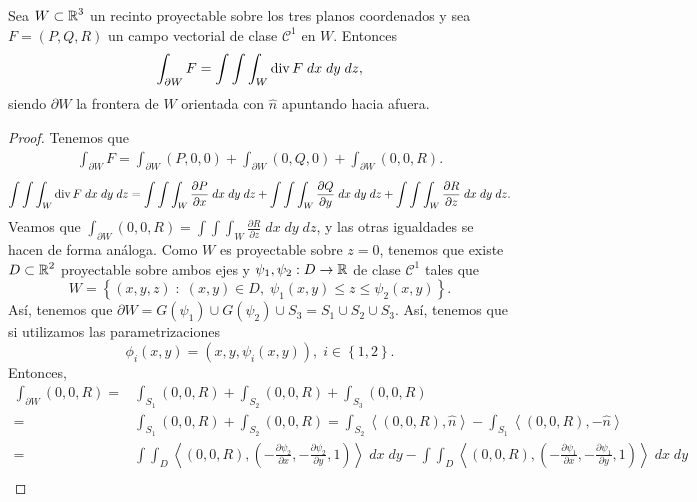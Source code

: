 \begin{theorem}
Sea $\displaystyle W \subset \mathbb{R}^{3} $ un recinto proyectable sobre los tres planos coordenados y sea $\displaystyle F = \left(P, Q, R\right) $ un campo vectorial de clase $\displaystyle \mathcal{C}^{1} $ en $\displaystyle W $. Entonces
\[\int _{\partial W}F =\int \int \int _{W}\operatorname{div} F \; dx \; dy \; dz ,\]
siendo $\displaystyle \partial W $ la frontera de $\displaystyle W $ orientada con $\displaystyle \hat{n} $ apuntando hacia afuera.
\end{theorem}
\begin{proof}
Tenemos que 
\[
\begin{split}
	\int _{\partial W}F =  \int _{\partial W}\left(P, 0, 0\right) + \int _{\partial W}\left(0,Q, 0\right) +\int _{\partial W}\left(0,0,R\right)  .
\end{split}
\]
\[\int \int \int _{W}\operatorname{div} F \; dx \; dy \; dz = \int \int \int _{W}\frac{\partial P}{\partial x} \; dx \; dy \; dz + \int \int \int _{W}\frac{\partial Q}{\partial y} \; dx \; dy \; dz + \int \int \int _{W}\frac{\partial R}{\partial z} \; dx \; dy \; dz .\]
Veamos que $\displaystyle \int _{\partial W}\left(0,0,R\right) =\int \int \int _{W}\frac{\partial R}{\partial z} \; dx \; dy \; dz $, y las otras igualdades se hacen de forma análoga. 
Como $\displaystyle W $ es proyectable sobre $\displaystyle z = 0 $, tenemos que existe $\displaystyle D \subset \mathbb{R}^{2} $ proyectable sobre ambos ejes y $\displaystyle \psi_{1}, \psi_{2} : D \to \mathbb{R} $ de clase $\displaystyle \mathcal{C}^{1} $ tales que 
\[W = \left\{ \left(x,y,z\right) \; : \; \left(x,y\right)\in D, \; \psi_{1}\left(x,y\right)\leq z \leq \psi_{2}\left(x,y\right)\right\}  .\]
Así, tenemos que $\displaystyle \partial W = G\left(\psi_{1}\right)\cup G\left(\psi_{2}\right)\cup S_{3} = S_{1} \cup S_{2} \cup S_{3}$. Así, tenemos que si utilizamos las parametrizaciones
\[\phi_{i}\left(x,y\right)=\left(x,y,\psi_{i}\left(x,y\right)\right), \; i \in \left\{ 1,2\right\}  .\]
Entonces, 
\[
\begin{split}
	\int _{\partial W}\left(0,0,R\right) = & \int _{S_{1}}\left(0,0,R\right) +\int _{S_{2}}\left(0,0,R\right) +\int _{S_{3}}\left(0,0,R\right) \\
	= & \int _{S_{1}}\left(0,0,R\right) +\int _{S_{2}}\left(0,0,R\right) = \int _{S_{2}}\left\langle \left(0,0,R\right), \hat{n} \right\rangle  -\int _{S_{1}}\left\langle \left(0,0,R\right), -\hat{n} \right\rangle  \\
	= & \int \int _{D}\left\langle \left(0,0,R\right), \left(-\frac{\partial \psi_{2}}{\partial x}, -\frac{\partial \psi_{2}}{\partial y}, 1\right) \right\rangle  \; dx \; dy - \int \int _{D}\left\langle \left(0,0,R\right), \left(-\frac{\partial \psi_{1}}{\partial x}, - \frac{\partial \psi_{1}}{\partial y}, 1\right) \right\rangle  \; dx \; dy \\

\end{split}\]
\end{proof}
